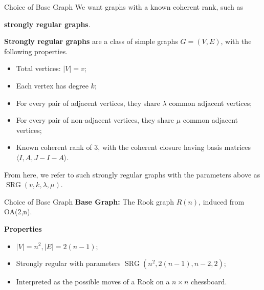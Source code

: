 \documentclass{beamer}
\begin{document}
\begin{frame}{Choice of Base Graph}
We want graphs with a known coherent rank, such as 

\textbf{strongly regular graphs}.

\vspace{1em}
\textbf{Strongly regular graphs} are a class of simple graphs $G=(V,E)$, with the following properties.
\begin{itemize}
    \item Total vertices: $|V| = v$;
    \item Each vertex has degree $k$;
    \item For every pair of adjacent vertices, they share $\lambda$ common adjacent vertices;
    \item For every pair of non-adjacent vertices, they share $\mu$ common adjacent vertices;
    \item Known coherent rank of 3, with the coherent closure having basis matrices $\langle I, A, J-I-A\rangle$.
\end{itemize}

From here, we refer to such strongly regular graphs with the parameters above as $\operatorname{SRG}(v,k,\lambda,\mu)$.
\end{frame}
\begin{frame}{Choice of Base Graph}
\textbf{Base Graph:} The Rook graph \( R(n) \), induced from OA(2,n).

\vspace{1em}
\textbf{Properties}
        \begin{itemize}
            \item $|V|=n^2, |E|=2(n-1)$;
            \item Strongly regular with parameters $\operatorname{SRG}(n^2,2(n-1),n-2,2)$;
            \item Interpreted as the possible moves of a Rook on a $n\times n$ chessboard.
        \end{itemize}
\end{frame}
\end{document}
